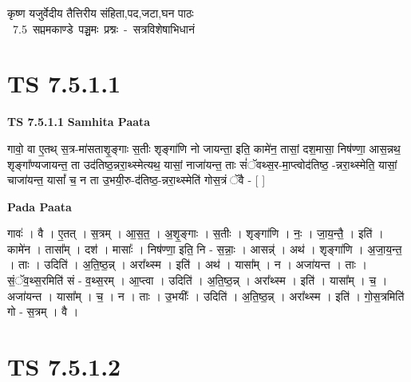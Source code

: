 \documentclass[17pt]{extarticle}
\begin{document}
\begin{titlepage}
    \begin{center}
 
\begin{sanskrit}
    { \Large
    कृष्ण यजुर्वेदीय तैत्तिरीय संहिता,पद,जटा,घन पाठः 
    }
    \\
    \vspace{2.5cm}
    \mbox{ \Large
    7.5      सप्तमकाण्डे पञ्चमः प्रश्नः - सत्रविशेषाभिधानं   }
\end{sanskrit}
\end{center}

\end{titlepage}
\tableofcontents
{}
\pagebreak


\section{ TS 7.5.1.1 }

\textbf{TS 7.5.1.1 } \newline
\textbf{Samhita Paata} \newline

गावो॒ वा ए॒तथ् स॒त्र-मा॑सताशृ॒ङ्गाः स॒तीः शृङ्गा॑णि नो जायन्ता॒ इति॒ कामे॑न॒ तासां॒ दश॒मासा॒ निष॑ण्णा॒ आस॒न्नथ॒ शृङ्गा᳚ण्यजायन्त॒ ता उद॑तिष्ठ॒न्नरा॒थ्स्मेत्यथ॒ यासां॒ नाजा॑यन्त॒ ताः सं॑ॅवथ्स॒र-मा॒प्त्वोद॑तिष्ठ॒ -न्नरा॒थ्स्मेति॒ यासां॒ चाजा॑यन्त॒ यासां᳚ च॒ न ता उ॒भयी॒रु-द॑तिष्ठ॒-न्नरा॒थ्स्मेति॑ गोस॒त्रं ॅवै - [  ] \newline

\textbf{Pada Paata} \newline

गावः॑ । वै । ए॒तत् । स॒त्रम् । आ॒स॒त॒ । अ॒शृ॒ङ्गाः । स॒तीः । शृङ्गा॑णि । नः॒ । जा॒य॒न्तै॒ । इति॑ । कामे॑न । तासा᳚म् । दश॑ । मासाः᳚ । निष॑ण्णा॒ इति॒ नि - स॒न्नाः॒ । आसन्न्॑ । अथ॑ । शृङ्गा॑णि । अ॒जा॒य॒न्त॒ । ताः । उदिति॑ । अ॒ति॒ष्ठ॒न्न् । अरा᳚थ्स्म । इति॑ । अथ॑ । यासा᳚म् । न । अजा॑यन्त । ताः । सं॒ॅव॒थ्स॒रमिति॑ सं -  व॒थ्स॒रम् । आ॒प्त्वा । उदिति॑ । अ॒ति॒ष्ठ॒न्न् । अरा᳚थ्स्म । इति॑ । यासा᳚म् । च॒ । अजा॑यन्त । यासा᳚म् । च॒ । न । ताः । उ॒भयीः᳚ । उदिति॑ । अ॒ति॒ष्ठ॒न्न् । अरा᳚थ्स्म । इति॑ । गो॒स॒त्रमिति॑ गो - स॒त्रम् । वै ।  \newline





\section{ TS 7.5.1.2 }
\end{document}
